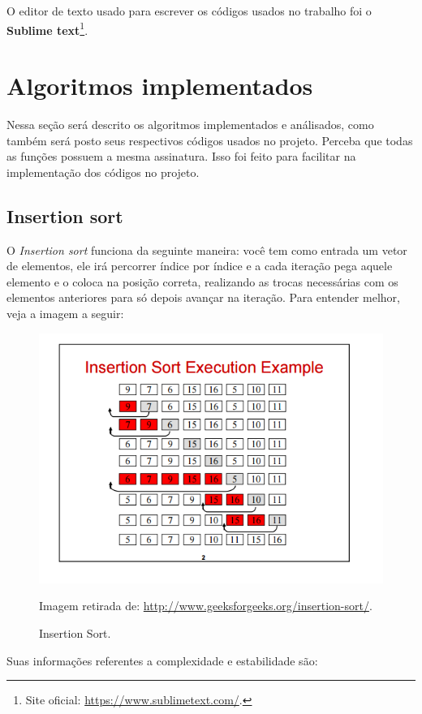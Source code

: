 O editor de texto usado para escrever os códigos usados no trabalho foi o \textbf{Sublime text}\footnote{Site oficial: \url{https://www.sublimetext.com/}.}.

\section{Algoritmos implementados}
Nessa seção será descrito os algoritmos implementados e análisados, como também será posto seus respectivos códigos usados no projeto. Perceba que todas as funções possuem a mesma assinatura. Isso foi feito para facilitar na implementação dos códigos no projeto.

\subsection{Insertion sort}
O \textit{Insertion sort} funciona da seguinte maneira: você tem como entrada um vetor de elementos, ele irá percorrer índice por índice e a cada iteração pega aquele elemento e o coloca na posição correta, realizando as trocas necessárias com os elementos anteriores para só depois avançar na iteração. Para entender melhor, veja a imagem a seguir:

\begin{figure}[!htb]
	\centering
	\includegraphics{img/insertion-sort.png}
	\caption{Insertion Sort.}
	\small{Imagem retirada de: \url{http://www.geeksforgeeks.org/insertion-sort/}.}
	\label{insertion-sort}
\end{figure}

Suas informações referentes a complexidade e estabilidade são:

